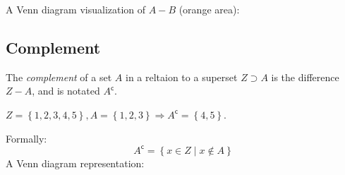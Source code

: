 A Venn diagram visualization of $A-B$ (orange area):
\begin{figure}[H]
  \centering
\end{figure}

\subsection{Complement}
The \emph{complement} of a set $A$ in a reltaion to a superset $Z\supset A$ is the difference $Z-A$, and is notated $A^{\mathsf{c}}$.
\begin{example}
  $Z=\left\{ 1,2,3,4,5 \right\}, A=\left\{ 1,2,3 \right\} \Rightarrow A^{\mathsf{c}}=\left\{ 4,5 \right\}$.
\end{example}
Formally:
\begin{equation*}
  A^{\mathsf{c}} = \left\{ x\in Z \mid x\notin A \right\}
\end{equation*}
A Venn diagram representation:
\begin{figure}[H]
  \centering
\end{figure}

